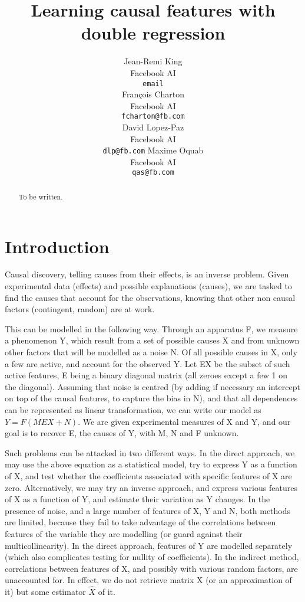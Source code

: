 \documentclass{article}
\title{Learning causal features with double regression}
\author{%
  Jean-Remi King\\
  Facebook AI\\
  \texttt{email} \\
  \And
  Fran\c{c}ois Charton\\
  Facebook AI\\
  \texttt{fcharton@fb.com}\\
  \And
  David Lopez-Paz\\
  Facebook AI\\
  \texttt{dlp@fb.com}
  \And
  Maxime Oquab\\
  Facebook AI\\
  \texttt{qas@fb.com}
}
\begin{document}
\maketitle

\begin{abstract}
    To be written.
\end{abstract}

\section{Introduction}
Causal discovery, telling causes from their effects, is an inverse problem. Given experimental data (effects) and possible explanations (causes), we are tasked to find the causes that account for the observations, knowing that other non causal factors (contingent, random) are at work. 

This can be modelled in the following way. Through an apparatus F, we measure a phenomenon Y, which result from a set of possible causes X and from unknown other factors that will be modelled as a noise N. Of all possible causes in X, only a few are active, and account for the observed Y. Let EX be the subset of such active features, E being a binary diagonal matrix (all zeroes except a few 1 on the diagonal). Assuming that noise is centred (by adding if necessary an intercept on top of the causal features, to capture the bias in N), and that all dependences can be represented as linear transformation, we can write our model as $Y = F(MEX + N)$. We are given experimental measures of X and Y, and our goal is to recover E, the causes of Y, with M, N and F unknown.

Such problems can be attacked in two different ways. In the direct approach, we may use the above equation as a statistical model, try to express Y as a function of X, and test whether the coefficients associated with specific features of X are zero. Alternatively, we may try an inverse approach, and express various features of X as a function of Y, and estimate their variation as Y changes. In the presence of noise, and a large number of features of X, Y and N, both methods are limited, because they fail to take advantage of the correlations between features of the variable they are modelling (or guard against their multicollinearity). In the direct approach, features of Y are modelled separately (which also complicates testing for nullity of coefficients). In the indirect method, correlations between features of X, and possibly with various random factors, are unaccounted for. In effect, we do not retrieve matrix X (or an approximation of it) but some estimator $\hat X$ of it.
\end{document}
